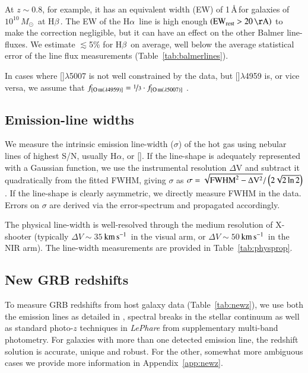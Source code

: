 \documentclass[traditabstract, longauth]{aa}
\newcommand{\kms}{$\rm{km\,s^{-1}}$}
\newcommand{\hb}{H$\beta$}
\newcommand{\ha}{H$\alpha$}
\newcommand{\oiii}{[\ion{O}{iii}]}
\newcommand{\Msun}{$M_\odot$}
\begin{document}
At $z\sim0.8$, for example, it has an equivalent width (EW) of 1\,\AA\,for galaxies of $10^{10}$\,\Msun\, at \hb\,\citep{2011ApJ...730..137Z}. The EW of the \ha\, line is high enough $(\rm{EW}_{\rm{rest}} > 20\,\AA)$ to make the correction negligible, but it can have an effect on the other Balmer line-fluxes. We estimate $\lesssim$5\% for \hb\, on average, well below the average statistical error of the line flux measurements (Table~\ref{tab:balmerlines}).
 
In cases where \oiii$\lambda$5007 is not well constrained by the data, but \oiii$\lambda$4959 is, or vice versa, we assume that $f_{[\ion{O}{iii}(\lambda 4959)]} = \nicefrac{1}{3} \cdot f_{[\ion{O}{iii}(\lambda 5007)]}$ \citep{2000MNRAS.312..813S}.

\subsection{Emission-line widths}

We measure the intrinsic emission line-width ($\sigma$) of the hot gas using nebular lines of highest S/N, usually \ha, or \oiii. If the line-shape is adequately represented with a Gaussian function, we use the instrumental resolution $\Delta$V and subtract it quadratically from the fitted FWHM, giving $\sigma$ as $\sigma = \sqrt{\rm{FWHM}^2 - \Delta V^2} / \left(2\sqrt{2\ln 2}\right)$. If the line-shape is clearly asymmetric, we directly measure FWHM in the data. Errors on $\sigma$ are derived via the error-spectrum and propagated accordingly.

The physical line-width is well-resolved through the medium resolution of X-shooter (typically $\Delta V \sim 35\,$\kms\, in the visual arm, or $\Delta V \sim 50\,$\kms\, in the NIR arm). The line-width measurements are provided in Table~\ref{tab:physprop}.



\subsection{New GRB redshifts}
\label{sec:newzs}

To measure GRB redshifts from host galaxy data (Table~\ref{tab:newz}), we use both the emission lines as detailed in \citet{2012ApJ...758...46K}, spectral breaks in the stellar continuum \citep{2012ApJ...752...62J} as well as standard photo-$z$ techniques in \textit{LePhare} \citep{1999MNRAS.310..540A, 2006A&A...457..841I} from supplementary multi-band photometry. For galaxies with more than one detected emission line, the redshift solution is accurate, unique and robust. For the other, somewhat more ambiguous cases we provide more information in Appendix~\ref{app:newz}. 
\end{document}
